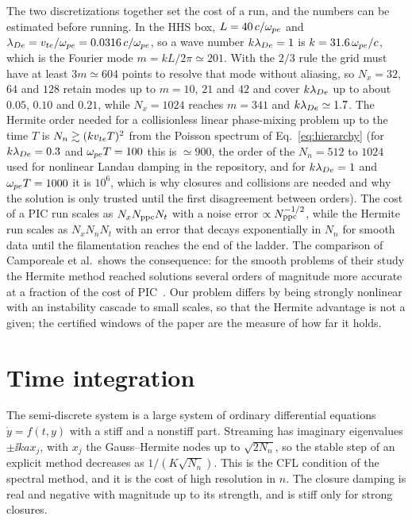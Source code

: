 The two discretizations together set the cost of a run, and the numbers can be estimated before running. In the HHS box, $L=40\,c/\omega_{pe}$ and $\lambda_{De}=v_{te}/\omega_{pe}=0.0316\,c/\omega_{pe}$, so a wave number $k\lambda_{De}=1$ is $k=31.6\,\omega_{pe}/c$, which is the Fourier mode $m=kL/2\pi\simeq201$. With the $2/3$ rule the grid must have at least $3m\simeq604$ points to resolve that mode without aliasing, so $N_x=32$, $64$ and $128$ retain modes up to $m=10$, $21$ and $42$ and cover $k\lambda_{De}$ up to about $0.05$, $0.10$ and $0.21$, while $N_x=1024$ reaches $m=341$ and $k\lambda_{De}\simeq1.7$. The Hermite order needed for a collisionless linear phase-mixing problem up to the time $T$ is $N_n\gtrsim(kv_{te} T)^2$ from the Poisson spectrum of Eq.~\eqref{eq:hierarchy} (for $k\lambda_{De}=0.3$ and $\omega_{pe} T=100$ this is $\simeq900$, the order of the $N_n=512$ to $1024$ used for nonlinear Landau damping in the repository, and for $k\lambda_{De}=1$ and $\omega_{pe} T=1000$ it is $10^6$, which is why closures and collisions are needed and why the solution is only trusted until the first disagreement between orders). The cost of a PIC run scales as $N_xN_{\rm ppc}N_t$ with a noise error $\propto N_{\rm ppc}^{-1/2}$, while the Hermite run scales as $N_xN_nN_t$ with an error that decays exponentially in $N_n$ for smooth data until the filamentation reaches the end of the ladder. The comparison of Camporeale et al.\ shows the consequence: for the smooth problems of their study the Hermite method reached solutions several orders of magnitude more accurate at a fraction of the cost of PIC~\citep{Camporeale2016}. Our problem differs by being strongly nonlinear with an instability cascade to small scales, so that the Hermite advantage is not a given; the certified windows of the paper are the measure of how far it holds.

\section{Time integration}\label{sec:time}

The semi-discrete system is a large system of ordinary differential equations $\dot y=f(t,y)$ with a stiff and a nonstiff part. Streaming has imaginary eigenvalues $\pm\ii kax_j$, with $x_j$ the Gauss--Hermite nodes up to $\sqrt{2N_n}$, so the stable step of an explicit method decreases as $1/(K\sqrt{N_n})$. This is the CFL condition of the spectral method, and it is the cost of high resolution in $n$. The closure damping is real and negative with magnitude up to its strength, and is stiff only for strong closures.


